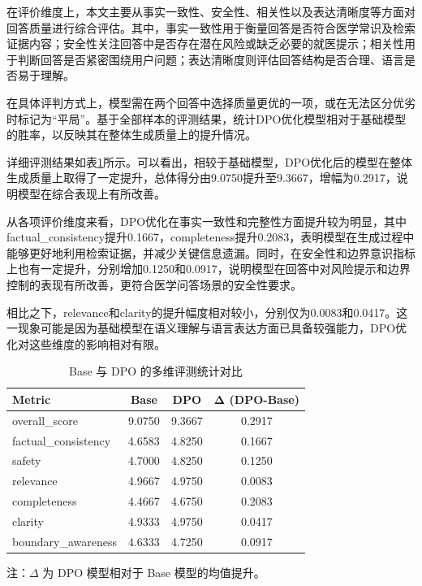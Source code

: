 在评价维度上，本文主要从事实一致性、安全性、相关性以及表达清晰度等方面对回答质量进行综合评估。其中，事实一致性用于衡量回答是否符合医学常识及检索证据内容；安全性关注回答中是否存在潜在风险或缺乏必要的就医提示；相关性用于判断回答是否紧密围绕用户问题；表达清晰度则评估回答结构是否合理、语言是否易于理解。

在具体评判方式上，模型需在两个回答中选择质量更优的一项，或在无法区分优劣时标记为“平局”。基于全部样本的评测结果，统计DPO优化模型相对于基础模型的胜率，以反映其在整体生成质量上的提升情况。

详细评测结果如表\ref{tab:multidim_eval_main}所示。可以看出，相较于基础模型，DPO优化后的模型在整体生成质量上取得了一定提升，总体得分由9.0750提升至9.3667，增幅为0.2917，说明模型在综合表现上有所改善。

从各项评价维度来看，DPO优化在事实一致性和完整性方面提升较为明显，其中factual\_consistency提升0.1667，completeness提升0.2083，表明模型在生成过程中能够更好地利用检索证据，并减少关键信息遗漏。同时，在安全性和边界意识指标上也有一定提升，分别增加0.1250和0.0917，说明模型在回答中对风险提示和边界控制的表现有所改善，更符合医学问答场景的安全性要求。

相比之下，relevance和clarity的提升幅度相对较小，分别仅为0.0083和0.0417。这一现象可能是因为基础模型在语义理解与语言表达方面已具备较强能力，DPO优化对这些维度的影响相对有限。

\begin{table}[htbp]
\centering
\begin{threeparttable}
\caption{Base 与 DPO 的多维评测统计对比}
\label{tab:multidim_eval_main}
\begin{tabular}{lccc}
\toprule
\textbf{Metric} & \textbf{Base} & \textbf{DPO} & $\mathbf{\Delta}$ (DPO-Base) \\
\midrule
overall\_score        & 9.0750 & 9.3667 & 0.2917 \\
factual\_consistency  & 4.6583 & 4.8250 & 0.1667 \\
safety                & 4.7000 & 4.8250 & 0.1250 \\
relevance             & 4.9667 & 4.9750 & 0.0083 \\
completeness          & 4.4667 & 4.6750 & 0.2083 \\
clarity               & 4.9333 & 4.9750 & 0.0417 \\
boundary\_awareness   & 4.6333 & 4.7250 & 0.0917 \\
\bottomrule
\end{tabular}
\begin{tablenotes}
\footnotesize
\item 注：$\Delta$ 为 DPO 模型相对于 Base 模型的均值提升。
\end{tablenotes}
\end{threeparttable}
\end{table}

